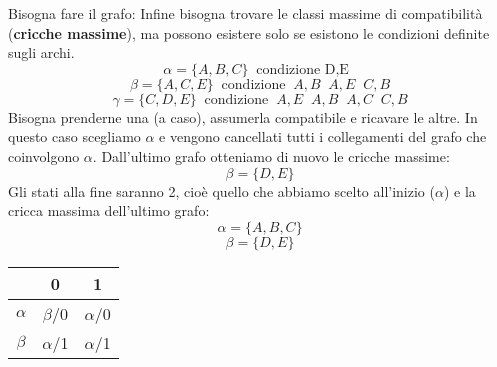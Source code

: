 \documentclass[a4paper]{article}
\theoremstyle{break}
\theoremstyle{break}
\theoremstyle{break}
\theoremstyle{break}
\begin{document}
Bisogna fare il grafo:
\label{D2}
Infine bisogna trovare le classi massime di compatibilità (\textbf{cricche massime}), ma possono
esistere solo se esistono le condizioni definite sugli archi.
\[
\alpha = \{A,B,C\}\;\;\text{condizione D,E}\;\; 
\] 
\[
\beta = \{A,C,E\} \;\; \text{condizione}\;\;A,B\;\; A,E\;\; C,B
\] 
\[
\gamma = \{C,D,E\} \;\; \text{condizione}\;\;A,E\;\;A,B\;\;A,C\;\;C,B
\] 
Bisogna prenderne una (a caso), assumerla compatibile e ricavare le altre. In questo caso
scegliamo \( \alpha \) e vengono cancellati tutti i collegamenti del grafo che coinvolgono
\( \alpha \). 
\label{D3}
Dall'ultimo grafo otteniamo di nuovo le cricche massime:
\[
\beta = \{D,E\} 
\] 
Gli stati alla fine saranno 2, cioè quello che abbiamo scelto all'inizio (\( \alpha \)) e
la cricca massima dell'ultimo grafo:
\[
\alpha = \{A,B,C\}
\] 
\[
\beta = \{D,E\} 
\] 
\begin{table}[H]
  \begin{center}
    \begin{tabular}{c|c|c}
      & 0 & 1\\
      \hline
      \( \alpha \) & \( \beta \)/0 & \( \alpha \)/0 \\
      \( \beta \) & \( \alpha \)/1 & \( \alpha \)/1 \\
    \end{tabular}
  \end{center}
\end{table}
\end{document}
